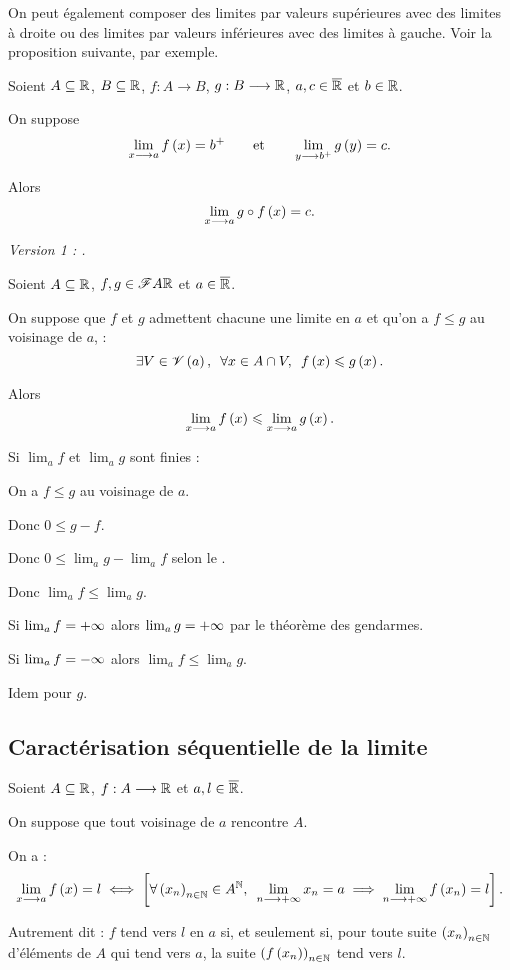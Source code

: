 \begin{rem}
On peut également composer des limites par valeurs supérieures avec des limites à droite ou des limites par valeurs inférieures avec des limites à gauche. Voir la proposition suivante, par exemple.
\end{rem}

\begin{prop}
Soient \(A\subseteq\mathbb{R}\), \(B\subseteq\mathbb{R}\), \(f:A\to B\), \(g:B\longrightarrow\mathbb{R}\), \(a,c\in\overline{\mathbb{R}}\) et \(b\in\mathbb{R}\).

On suppose \[\lim_{x\longrightarrow a}f\left(x\right)=b^+\qquad\text{et}\qquad\lim_{y\longrightarrow b^+}g\left(y\right)=c.\]

Alors \[\lim_{x\longrightarrow a}g\circ f\left(x\right)=c.\]
\end{prop}

\begin{cor}
\textit{Version 1 : .}

Soient \(A\subseteq\mathbb{R}\), \(f,g\in\mathscr{F}{A}{\mathbb{R}}\) et \(a\in\overline{\mathbb{R}}\).

On suppose que \(f\) et \(g\) admettent chacune une limite en \(a\) et qu'on a \(f\leq g\) au voisinage de \(a\), \cad : \[\quantifs{\exists V\in\V{a};\forall x\in A\inter V}f\paren{x}\leq g\paren{x}.\]

Alors \[\lim_{x\longrightarrow a}f\left(x\right)\leqslant\lim_{x\longrightarrow a}g\left(x\right).\]
\end{cor}

\begin{dem}
Si \(\lim_af\) et \(\lim_ag\) sont finies :

On a \(f\leq g\) au voisinage de \(a\).

Donc \(0\leq g-f\).

Donc \(0\leq\lim_ag-\lim_af\) selon le .

Donc \(\lim_af\leq\lim_ag\).

Si \(\lim_af=+\infty\) alors \(\lim_ag=+\infty\) par le théorème des gendarmes.

Si \(\lim_af=-\infty\) alors \(\lim_af\leq\lim_ag\).

Idem pour \(g\).
\end{dem}

\subsection{Caractérisation séquentielle de la limite}

\begin{prop}
Soient \(A\subseteq\mathbb{R}\), \(f:A\longrightarrow\mathbb{R}\) et \(a,l\in\overline{\mathbb{R}}\).

On suppose que tout voisinage de \(a\) rencontre \(A\).

On a : \[\lim_{x\to a}f\paren{x}=l\ssi\croch{\quantifs{\forall\paren{x_n}_{n\in\N}\in A^\N}\lim_{n\to\pinf}x_n=a\imp\lim_{n\to\pinf}f\paren{x_n}=l}.\]

Autrement dit : \(f\) tend vers \(l\) en \(a\) si, et seulement si, pour toute suite \(\left(x_n\right)_{n\in\mathbb{N}}\) d'éléments de \(A\) qui tend vers \(a\), la suite \(\left(f\left(x_n\right)\right)_{n\in\mathbb{N}}\) tend vers \(l\).
\end{prop}

